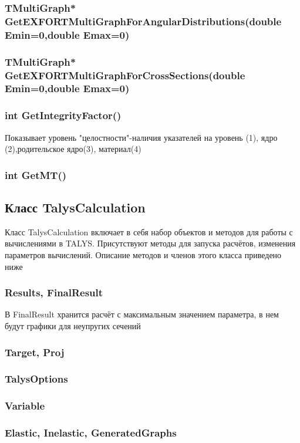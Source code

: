 \documentclass[a4paper,12pt]{extarticle}
\begin{document}
\subsubsection{TMultiGraph* GetEXFORTMultiGraphForAngularDistributions(double Emin=0,double Emax=0)}

\subsubsection{TMultiGraph* GetEXFORTMultiGraphForCrossSections(double Emin=0,double Emax=0)}

\subsubsection{int GetIntegrityFactor()}
Показывает уровень "целостности"-наличия указателей на уровень (1), ядро (2),родительское ядро(3), материал(4) 
\subsubsection{int GetMT()}

\subsection{Класс TalysCalculation}
Класс TalysCalculation включает в себя набор объектов и методов для работы с вычислениями в TALYS. Присутствуют методы для запуска расчётов, изменения параметров вычислений. Описание методов и членов этого класса приведено ниже
\subsubsection{Results, FinalResult}
В FinalResult хранится расчёт с максимальным значением параметра, в нем будут графики для неупругих сечений
\subsubsection{Target, Proj}

\subsubsection{TalysOptions}

\subsubsection{Variable}

\subsubsection{Elastic, Inelastic, GeneratedGraphs}
\end{document}
